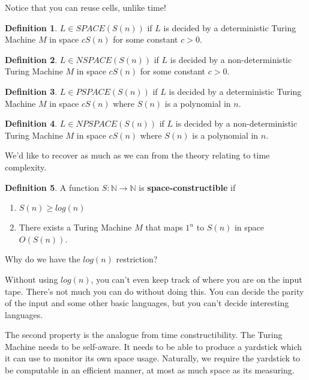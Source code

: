 \documentclass{article}
\theoremstyle{definition}
\newtheorem{definition}{Definition}
\begin{document}
Notice that you can reuse cells, unlike time!

\begin{definition}
    $L \in SPACE(S(n))$ if $L$ is decided by a deterministic Turing Machine $M$ in space $cS(n)$ for some constant $c > 0$.
\end{definition}

\begin{definition}
    $L \in NSPACE(S(n))$ if $L$ is decided by a non-deterministic Turing Machine $M$ in space $cS(n)$ for some constant $c > 0$.
\end{definition}

\begin{definition}
    $L \in PSPACE(S(n))$ if $L$ is decided by a deterministic Turing Machine $M$ in space $cS(n)$ where $S(n)$ is a polynomial in $n$.
\end{definition}

\begin{definition}
    $L \in NPSPACE(S(n))$ if $L$ is decided by a non-deterministic Turing Machine $M$ in space $cS(n)$ where $S(n)$ is a polynomial in $n$.
\end{definition}

We'd like to recover as much as we can from the theory relating to time complexity.

\begin{definition}
    A function $S: \mathbb{N} \xrightarrow{} \mathbb{N}$ is \textbf{space-constructible} if 
    \begin{enumerate}
        \item $S(n) \geq log(n)$
        \item There exists a Turing Machine $M$ that maps $1^{n}$ to $S(n)$ in space $O(S(n))$.
    \end{enumerate}
\end{definition}

Why do we have the $log(n)$ restriction?

Without using $log(n)$, you can't even keep track of where you are on the input tape. There's not much you can do without doing this. You can decide the parity of the input and some other basic languages, but you can't decide interesting languages.

The second property is the analogue from time constructibility. The Turing Machine needs to be self-aware. It needs to be able to produce a yardstick which it can use to monitor its own space usage. Naturally, we require the yardstick to be computable in an efficient manner, at most as much space as its measuring.
\end{document}
